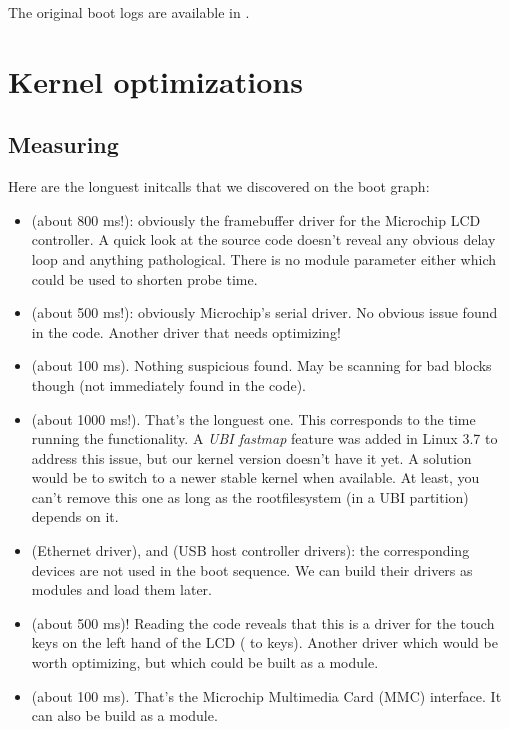 The original boot logs are available in
.

\section{Kernel optimizations}

\subsection{Measuring}

Here are the longuest initcalls that we discovered on the boot graph:

\begin{itemize}
\item {} (about 800 ms!): obviously the
      framebuffer driver
      for the Microchip LCD controller. A quick look at the source code
       doesn't reveal any obvious
      delay loop and anything pathological. There is no module parameter
      either which could be used to shorten probe time.
\item {} (about 500 ms!): obviously Microchip's serial
      driver. No obvious issue found in the code. Another driver
      that needs optimizing!
\item {} (about 100 ms). Nothing suspicious found.
      May be scanning for bad blocks though (not immediately found in
      the code).
\item {} (about 1000 ms!). That's the longuest one.
      This corresponds to the time running the 
      functionality. A {\em UBI fastmap} feature was added in Linux 3.7
      to address this issue, but our kernel version doesn't have it
      yet. A solution would be to switch to a newer stable kernel
      when available. At least, you can't remove this one
      as long as the rootfilesystem (in a UBI partition) depends on
      it.
\item {} (Ethernet driver),  and
       (USB host controller drivers): the
      corresponding devices are not used in the boot sequence. We can
      build their drivers as modules and load them later.
\item {} (about 500 ms)! Reading the code
      reveals that this is a driver for the touch keys on the left
      hand of the LCD ( to  keys). Another driver
      which would be worth optimizing, but which could be built as a module.
\item {} (about 100 ms). That's the Microchip Multimedia
      Card (MMC) interface. It can also be build as a module.
\end{itemize}

